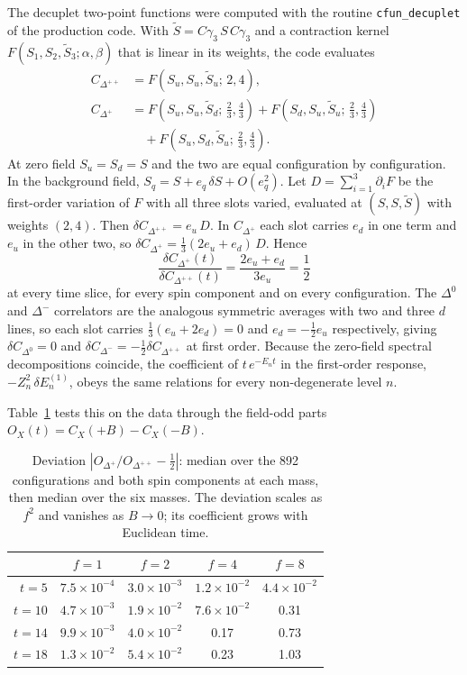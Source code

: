 \documentclass[aps,prd,preprint,nofootinbib,floatfix]{revtex4-2}
\begin{document}
The decuplet two-point functions were computed with the routine \texttt{cfun\_decuplet} of the production code. With $\tilde S=C\gamma_3\,S\,C\gamma_3$ and a contraction kernel $F(S_1,S_2,\tilde S_3;\alpha,\beta)$ that is linear in its weights, the code evaluates
\begin{align}
C_{\Delta^{++}}&=F(S_u,S_u,\tilde S_u;\,2,4),\\
C_{\Delta^{+}}&=F(S_u,S_u,\tilde S_d;\,\tfrac23,\tfrac43)+F(S_d,S_u,\tilde S_u;\,\tfrac23,\tfrac43)\nonumber\\&\quad+F(S_u,S_d,\tilde S_u;\,\tfrac23,\tfrac43).
\end{align}
At zero field $S_u=S_d=S$ and the two are equal configuration by configuration. In the background field, $S_q=S+e_q\,\delta S+O(e_q^2)$. Let $D=\sum_{i=1}^3\partial_iF$ be the first-order variation of $F$ with all three slots varied, evaluated at $(S,S,\tilde S)$ with weights $(2,4)$. Then $\delta C_{\Delta^{++}}=e_u\,D$. In $C_{\Delta^+}$ each slot carries $e_d$ in one term and $e_u$ in the other two, so $\delta C_{\Delta^{+}}=\tfrac13(2e_u+e_d)\,D$. Hence
\begin{equation}
\frac{\delta C_{\Delta^{+}}(t)}{\delta C_{\Delta^{++}}(t)}=\frac{2e_u+e_d}{3e_u}=\frac12
\end{equation}
at every time slice, for every spin component and on every configuration. The $\Delta^0$ and $\Delta^-$ correlators are the analogous symmetric averages with two and three $d$ lines, so each slot carries $\tfrac13(e_u+2e_d)=0$ and $e_d=-\tfrac12e_u$ respectively, giving $\delta C_{\Delta^0}=0$ and $\delta C_{\Delta^-}=-\tfrac12\delta C_{\Delta^{++}}$ at first order. Because the zero-field spectral decompositions coincide, the coefficient of $t\,e^{-E_nt}$ in the first-order response, $-Z_n^2\,\delta E_n^{(1)}$, obeys the same relations for every non-degenerate level $n$.

Table~\ref{tab:identitycheck} tests this on the data through the field-odd parts $O_X(t)=C_X(+B)-C_X(-B)$.

\begin{table}[h]
\caption{Deviation $|O_{\Delta^+}/O_{\Delta^{++}}-\tfrac12|$: median over the 892 configurations and both spin components at each mass, then median over the six masses. The deviation scales as $f^2$ and vanishes as $B\to0$; its coefficient grows with Euclidean time.}
\label{tab:identitycheck}
\centering
\begin{tabular}{rcccc}
\toprule
& $f=1$ & $f=2$ & $f=4$ & $f=8$\\
\midrule
$t=5$  & $7.5\times10^{-4}$ & $3.0\times10^{-3}$ & $1.2\times10^{-2}$ & $4.4\times10^{-2}$\\
$t=10$ & $4.7\times10^{-3}$ & $1.9\times10^{-2}$ & $7.6\times10^{-2}$ & 0.31\\
$t=14$ & $9.9\times10^{-3}$ & $4.0\times10^{-2}$ & 0.17 & 0.73\\
$t=18$ & $1.3\times10^{-2}$ & $5.4\times10^{-2}$ & 0.23 & 1.03\\
\bottomrule
\end{tabular}
\end{table}
\end{document}
